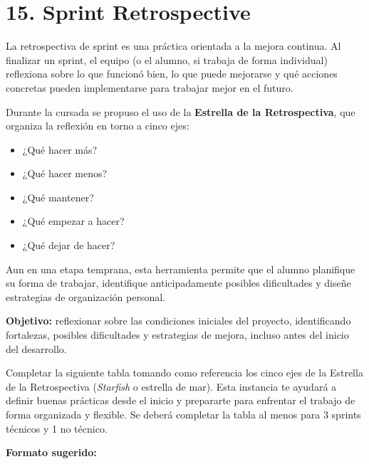 \documentclass[
11pt, %
]{charter}
\begin{document}
\section{15. Sprint Retrospective}    
\label{sec:sprint_retro}

La retrospectiva de sprint es una práctica orientada a la mejora continua. Al finalizar un sprint, el equipo (o el alumno, si trabaja de forma individual) reflexiona sobre lo que funcionó bien, lo que puede mejorarse y qué acciones concretas pueden implementarse para trabajar mejor en el futuro.

Durante la cursada se propuso el uso de la \textbf{Estrella de la Retrospectiva}, que organiza la reflexión en torno a cinco ejes:

\begin{itemize}
\item  ¿Qué hacer más?
\item  ¿Qué hacer menos?
\item  ¿Qué mantener?
\item  ¿Qué empezar a hacer?
\item  ¿Qué dejar de hacer?
\end{itemize}

Aun en una etapa temprana, esta herramienta permite que el alumno planifique su forma de trabajar, identifique anticipadamente posibles dificultades y diseñe estrategias de organización personal.

\textbf{Objetivo:} reflexionar sobre las condiciones iniciales del proyecto, identificando fortalezas, posibles dificultades y estrategias de mejora, incluso antes del inicio del desarrollo.


Completar la siguiente tabla tomando como referencia los cinco ejes de la Estrella de la Retrospectiva (\emph{Starfish} o estrella de mar). Esta instancia te ayudará a definir buenas prácticas desde el inicio y prepararte para enfrentar el trabajo de forma organizada y flexible. Se deberá completar la tabla al menos para 3 sprints técnicos y 1 no técnico.

\textbf{Formato sugerido:}
\end{document}
